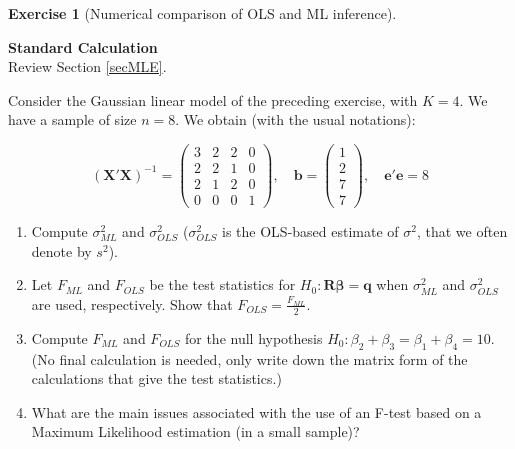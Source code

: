 \documentclass[
  11pt,
]{book}
\theoremstyle{definition}
\theoremstyle{definition}
\theoremstyle{definition}
\newtheorem{exercise}{Exercise}[chapter]
\theoremstyle{definition}
\theoremstyle{remark}
\begin{document}

\begin{exercisebox}

\begin{exercise}[Numerical comparison of OLS and ML inference]
\protect\hypertarget{exr:estimation-ols-mle-numerical}{}\label{exr:estimation-ols-mle-numerical}

\textbf{Standard \textbar{} Calculation}\\
Review Section \ref{secMLE}.

Consider the Gaussian linear model of the preceding exercise, with \(K = 4\). We have a sample of size \(n = 8\). We obtain (with the usual notations):

\[(\mathbf{X}'\mathbf{X})^{-1} =
\begin{pmatrix}
3 & 2 & 2 & 0 \\
2 & 2 & 1 & 0 \\
2 & 1 & 2 & 0 \\
0 & 0 & 0 & 1
\end{pmatrix},
\quad
\mathbf{b} =
\begin{pmatrix}
1 \\
2 \\
7 \\
7
\end{pmatrix},
\quad
\mathbf{e}'\mathbf{e} = 8\]

\begin{enumerate}
\def\labelenumi{\arabic{enumi}.}
\item
  Compute \(\sigma^2_{ML}\) and \(\sigma^2_{OLS}\) (\(\sigma^2_{OLS}\) is the OLS-based estimate of \(\sigma^2\), that we often denote by \(s^2\)).
\item
  Let \(F_{ML}\) and \(F_{OLS}\) be the test statistics for \(H_0: \mathbf{R}\boldsymbol{\beta} = \mathbf{q}\) when \(\sigma^2_{ML}\) and \(\sigma^2_{OLS}\) are used, respectively. Show that \(F_{OLS} = \frac{F_{ML}}{2}\).
\item
  Compute \(F_{ML}\) and \(F_{OLS}\) for the null hypothesis \(H_0: \beta_2 + \beta_3 = \beta_1 + \beta_4 = 10\). (No final calculation is needed, only write down the matrix form of the calculations that give the test statistics.)
\item
  What are the main issues associated with the use of an F-test based on a Maximum Likelihood estimation (in a small sample)?
\end{enumerate}

\end{exercise}

\end{exercisebox}
\end{document}
